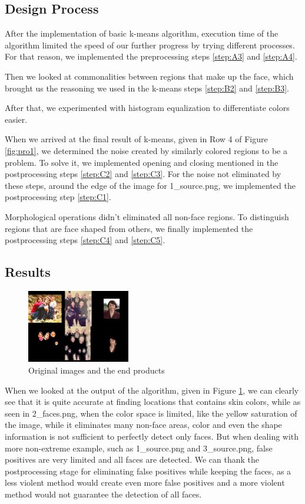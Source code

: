 \documentclass[conference]{IEEEtran}
\begin{document}
\subsection{Design Process}
After the implementation of basic k-means algorithm, execution time of the algorithm limited the speed of our further progress by trying different processes. For that reason, we implemented the preprocessing steps \ref{step:A3} and \ref{step:A4}.

Then we looked at commonalities between regions that make up the face, which brought us the reasoning we used in the k-means steps \ref{step:B2} and \ref{step:B3}.

After that, we experimented with histogram equalization to differentiate colors easier.

When we arrived at the final result of k-means, given in Row 4 of Figure \ref{fig:pro1}, we determined the noise created by similarly colored regions to be a problem. To solve it, we implemented opening and closing mentioned in the postprocessing steps \ref{step:C2} and \ref{step:C3}. For the noise not eliminated by these steps, around the edge of the image for 1\_source.png, we implemented the postprocessing step \ref{step:C1}.

Morphological operations didn't eliminated all non-face regions. To distinguish regions that are face shaped from others, we finally implemented the postprocessing steps \ref{step:C4} and \ref{step:C5}.
\subsection{Results}
\begin{figure}[h]
    \centering
    \includegraphics[width=0.4\textwidth]{resources/End Result Compare.jpeg}
    \caption{Original images and the end products}
    \label{fig:end}
\end{figure}
When we looked at the output of the algorithm, given in Figure \ref{fig:end}, we can clearly see that it is quite accurate at finding locations that contains skin colors, while as seen in 2\_faces.png, when the color space is limited, like the yellow saturation of the image, while it eliminates many non-face areas, color and even the shape information is not sufficient to perfectly detect only faces. But when dealing with more non-extreme example, such as 1\_source.png and 3\_source.png, false positives are very limited and all faces are detected. We can thank the postprocessing stage for eliminating false positives while keeping the faces, as a less violent method would create even more false positives and a more violent method would not guarantee the detection of all faces.
\end{document}
